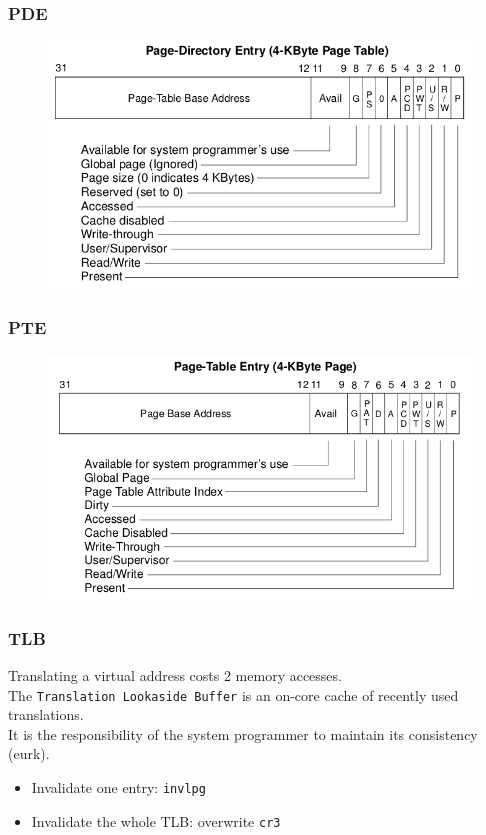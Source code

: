 \documentclass{beamer}
\begin{document}
\begin{frame}
  \frametitle{PDE}

  \begin{figure}
  \includegraphics[scale=0.4]{pde.png}
  \end{figure}
\end{frame}

\begin{frame}
  \frametitle{PTE}

  \begin{figure}
  \includegraphics[scale=0.4]{pte.png}
  \end{figure}
\end{frame}

\begin{frame}
  \frametitle{TLB}

  Translating a virtual address costs 2 memory accesses.\\
  \vspace{10pt}
  The \texttt{Translation Lookaside Buffer} is an on-core cache of recently used translations.\\
  It is the responsibility of the system programmer to maintain its consistency (eurk).
  \vspace{10pt}
  \begin{itemize}
  \item
    Invalidate one entry: \texttt{invlpg}
  \item
    Invalidate the whole TLB: overwrite \texttt{cr3}
  \end{itemize}
\end{frame}
\end{document}
